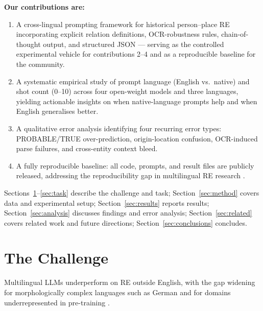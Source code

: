\documentclass[
]{ceurart}
\theoremstyle{definition}
\begin{document}
\noindent\textbf{Our contributions are:}
\begin{enumerate}[noitemsep]
  \item A cross-lingual prompting framework for historical person--place RE incorporating explicit relation definitions, OCR-robustness rules, chain-of-thought output, and structured JSON --- serving as the controlled experimental vehicle for contributions 2--4 and as a reproducible baseline for the community.
  \item A systematic empirical study of prompt language (English vs.\ native) and shot count (0--10) across four open-weight models and three languages, yielding actionable insights on when native-language prompts help and when English generalises better.
  \item A qualitative error analysis identifying four recurring error types: PROBABLE/TRUE over-prediction, origin-location confusion, OCR-induced parse failures, and cross-entity context bleed.
  \item A fully reproducible baseline: all code, prompts, and result files are publicly released, addressing the reproducibility gap in multilingual RE research \citep{ali2025multilingual}.
\end{enumerate}

Sections~\ref{sec:challenge}--\ref{sec:task} describe the challenge and task; Section~\ref{sec:method} covers data and experimental setup; Section~\ref{sec:results} reports results; Section~\ref{sec:analysis} discusses findings and error analysis; Section~\ref{sec:related} covers related work and future directions; Section~\ref{sec:conclusions} concludes.


\section{The Challenge}\label{sec:challenge}

Multilingual LLMs underperform on RE outside English, with the gap widening for morphologically complex languages such as German and for domains underrepresented in pre-training \citep{joshi-etal-2020-state,keinan2025emotional}.
\end{document}
